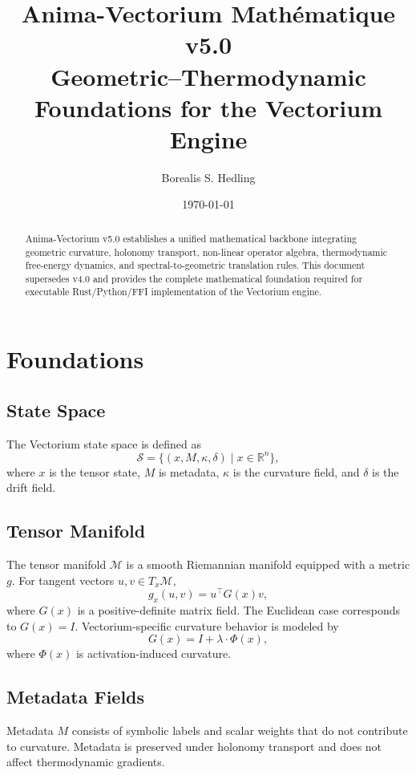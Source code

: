 \documentclass[11pt]{article}
\title{Anima-Vectorium Mathématique v5.0 \\
\large Geometric–Thermodynamic Foundations for the Vectorium Engine}
\author{Borealis S. Hedling}
\date{\today}
\begin{document}
\maketitle

\begin{abstract}
Anima-Vectorium v5.0 establishes a unified mathematical backbone integrating
geometric curvature, holonomy transport, non-linear operator algebra,
thermodynamic free-energy dynamics, and spectral-to-geometric translation rules.
This document supersedes v4.0 and provides the complete mathematical foundation
required for executable Rust/Python/FFI implementation of the Vectorium engine.
\end{abstract}

\tableofcontents

\section{Foundations}

\subsection{State Space}
The Vectorium state space is defined as
\[
\mathcal{S} = \{ (x, M, \kappa, \delta) \mid x \in \mathbb{R}^n \},
\]
where $x$ is the tensor state, $M$ is metadata, $\kappa$ is the curvature field,
and $\delta$ is the drift field.

\subsection{Tensor Manifold}
The tensor manifold $\mathcal{M}$ is a smooth Riemannian manifold equipped with
a metric $g$. For tangent vectors $u, v \in T_x\mathcal{M}$,
\[
g_x(u, v) = u^\top G(x) v,
\]
where $G(x)$ is a positive-definite matrix field. The Euclidean case corresponds
to $G(x) = I$. Vectorium-specific curvature behavior is modeled by
\[
G(x) = I + \lambda \cdot \Phi(x),
\]
where $\Phi(x)$ is activation-induced curvature.

\subsection{Metadata Fields}
Metadata $M$ consists of symbolic labels and scalar weights that do not
contribute to curvature. Metadata is preserved under holonomy transport and
does not affect thermodynamic gradients.
\end{document}
